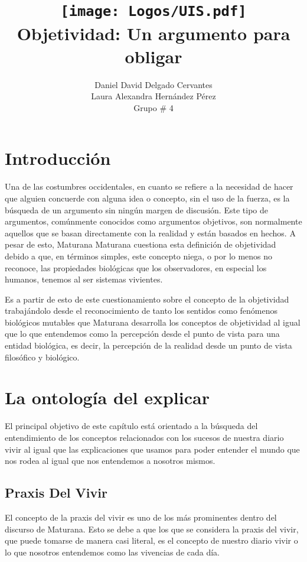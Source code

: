\documentclass[10pt]{article}
\title{
    \texttt{[image: Logos/UIS.pdf]} \\
    Objetividad: Un argumento para obligar}
\author{Daniel David Delgado Cervantes \\  
        Laura Alexandra Hernández Pérez\\ 
        Grupo \# 4
}
\begin{document}
    
\maketitle

    \section{Introducción}

    Una de las costumbres occidentales, en cuanto se refiere a la necesidad de hacer que alguien concuerde con alguna idea o concepto, sin el uso de la fuerza, es la búsqueda de un argumento sin ningún margen de discusión. Este tipo de argumentos, comúnmente conocidos como argumentos objetivos, son normalmente aquellos que se basan directamente con la realidad y están basados en hechos. A pesar de esto, Maturana Maturana cuestiona esta definición de objetividad debido a que, en términos simples, este concepto niega, o por lo menos no reconoce, las propiedades biológicas que los observadores, en especial los humanos, tenemos al ser sistemas vivientes.

    Es a partir de esto de este cuestionamiento sobre el concepto de la objetividad trabajándolo desde el reconocimiento de tanto los sentidos como fenómenos biológicos mutables que Maturana desarrolla los conceptos de objetividad al igual que lo que entendemos como la percepción desde el punto de vista para una entidad biológica, es decir, la percepción de la realidad desde un punto de vista filosófico y biológico. 

    \section{La ontología del explicar}

    El principal objetivo de este capítulo está orientado a la búsqueda del entendimiento de los conceptos relacionados con los sucesos de nuestra diario vivir al igual que las explicaciones que usamos para poder entender el mundo que nos rodea al igual que nos entendemos a nosotros mismos.

        \subsection{Praxis Del Vivir}

        El concepto de la praxis del vivir es uno de los más prominentes dentro del discurso de Maturana. Esto se debe a que los que se considera la praxis del vivir, que puede tomarse de manera casi literal, es el concepto de nuestro diario vivir o lo que nosotros entendemos como las vivencias de cada día.
        
\end{document}
